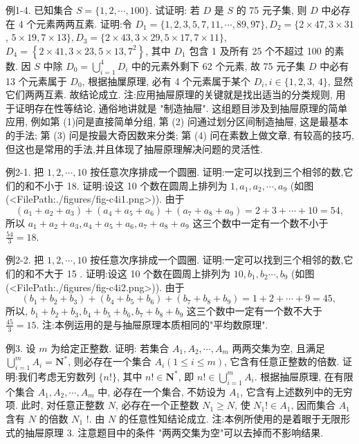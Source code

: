例1-4. 已知集合 $S=\{1,2, \cdots, 100\}$. 试证明:
若 $D$ 是 $S$ 的 75 元子集, 则 $D$ 中必存在 4 个元素两两互素.
证明:令 $D_1=\{1,2,3,5,7,11, \cdots, 89,97\}, D_2=\{2 \times 47,3 \times 31$, $5 \times 19,7 \times 13\}, D_3=\{2 \times 43,3 \times 29,5 \times 17,7 \times 11\}$,
$D_4=\left\{2 \times 41,3 \times 23,5 \times 13,7^2\right\}$, 其中 $D_1$ 包含 1 及所有 25 个不超过 100 的素数.
因 $S$ 中除 $D_0=\bigcup_{i=1}^4 D_i$ 中的元素外剩下 62 个元素, 故 75 元子集 $D$ 中必有 13 个元素属于 $D_0$, 根据抽屟原理, 必有 4 个元素属于某个 $D_i, i \in\{1,2,3$, $4\}$, 显然它们两两互素.
故结论成立.
注:应用抽屉原理的关键就是找出适当的分类规则, 用于证明存在性等结论, 通俗地讲就是 "制造抽屉". 这组题目涉及到抽屉原理的简单应用, 例如第 (1)问是直接简单分组, 第 (2) 问通过划分区间制造抽屉, 这是最基本的手法; 第 (3) 问是按最大奇因数来分类; 第 (4) 问在素数上做文章, 有较高的技巧,但这也是常用的手法,并且体现了抽屉原理解决问题的灵活性.



例2-1. 把 $1,2, \cdots, 10$ 按任意次序排成一个圆圈.
证明:一定可以找到三个相邻的数,它们的和不小于 18.
证明:设这 10 个数在圆周上排列为 $1, a_1, a_2, \cdots, a_9$ (如图(<FilePath:./figures/fig-c4i1.png>)). 由于
$$
\left(a_1+a_2+a_3\right)+\left(a_4+a_5+a_6\right)+\left(a_7+a_8+a_9\right)=2+3+\cdots+10=54,
$$
所以 $a_1+a_2+a_3, a_4+a_5+a_6, a_7+a_8+a_9$ 这三个数中一定有一个数不小于 $\frac{54}{3}=18$.



例2-2. 把 $1,2, \cdots, 10$ 按任意次序排成一个圆圈.
证明:一定可以找到三个相邻的数,它们的和不大于 15 .
证明:设这 10 个数在圆周上排列为 $10, b_1, b_2 \cdots, b_9$ (如图(<FilePath:./figures/fig-c4i2.png>)). 由于
$$
\left(b_1+b_2+b_3\right)+\left(b_4+b_5+b_6\right)+\left(b_7+b_8+b_9\right)=1+2+\cdots+9=45 \text {, }
$$
所以, $b_1+b_2+b_3, b_4+b_5+b_6, b_7+b_8+b_9$ 这三个数中一定有一个数不大于 $\frac{45}{3}=15$.
注:本例运用的是与抽屉原理本质相同的"平均数原理".



例3. 设 $m$ 为给定正整数.
证明: 若集合 $A_1, A_2, \cdots, A_m$ 两两交集为空, 且满足 $\bigcup_{i=1}^m A_i=\mathbf{N}^*$, 则必存在一个集合 $A_i(1 \leqslant i \leqslant m)$, 它含有任意正整数的倍数.
证明:我们考虑无穷数列 $\{n !\}$, 其中 $n ! \in \mathbf{N}^*$, 即 $n ! \in \bigcup_{i=1}^m A_i$. 根据抽屉原理, 在有限个集合 $A_1, A_2, \cdots, A_m$ 中, 必存在一个集合, 不妨设为 $A_1$, 它含有上述数列中的无穷项.
此时, 对任意正整数 $N$, 必存在一个正整数 $N_1 \geqslant N$, 使 $N_{1} ! \in A_1$, 因而集合 $A_1$ 含有 $N$ 的倍数 $N_1$ !. 由 $N$ 的任意性知结论成立.
注:本例所使用的是着眼于无限形式的抽屉原理 3. 注意题目中的条件 "两两交集为空"可以去掉而不影响结果.



